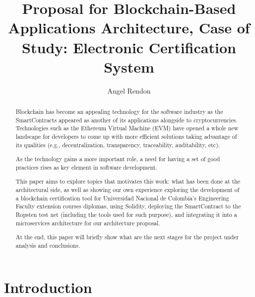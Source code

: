 \documentclass[runningheads]{llncs}
\begin{document}
%
\title{Proposal for Blockchain-Based Applications Architecture, Case of Study: Electronic Certification System}
%
%
\author{Angel Rendon}
%
%
%
\maketitle              %
%
\begin{abstract}
Blockchain has become an appealing technology for the software industry as the SmartContracts appeared as another of its applications alongside to cryptocurrencies. Technologies such as the Ethereum Virtual Machine (EVM) have opened a whole new landscape for developers to come up with more efficient solutions taking advantage of its qualities (e.g., decentralization, transparency, traceability, auditability, etc).

As the technology gains a more important role, a need for having a set of good practices rises as key element in software development.

This paper aims to explore topics that motivates this work: what has been done at the architectural side, as well as showing our own experience exploring the development of a blockchain certification tool for Universidad Nacional de Colombia's Engineering Faculty extension courses diplomas, using Solidity, deploying the SmartContract to the Ropsten test net (including the tools used for such purpose), and integrating it into a microservices architecture for our architecture proposal.

At the end, this paper will briefly show what are the next stages for the project under analysis and conclusions.

\end{abstract}
%

\section{Introduction}
\end{document}
